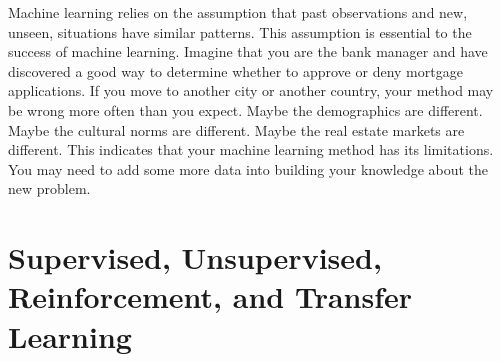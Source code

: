 Machine learning relies on the assumption that past observations and
new, unseen, situations have similar patterns.  This assumption is
essential to the success of machine learning.  Imagine that you are
the bank manager and have discovered a good way to determine whether
to approve or deny mortgage applications.  If you move to another city
or another country, your method may be wrong more often than you
expect. Maybe the demographics are different. Maybe the cultural norms
are different.  Maybe the real estate markets are different.  This
indicates that your machine learning method has its limitations.  You
may need to add some more data into building your knowledge about the
new problem.




\section{Supervised, Unsupervised,  Reinforcement, and Transfer Learning}

